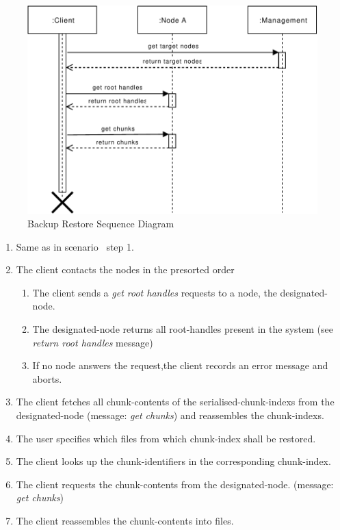\begin{figure}[h]
    \centering
    \includegraphics[width=\linewidth]{resources/backup_restore.pdf}
    \caption{Backup Restore Sequence Diagram}
    \label{fig:backup-restore}
\end{figure}

\begin{enumerate}
    \item Same as in scenario~ step 1.
    \item The \gls{client} contacts the \glspl{node} in the presorted order
        \begin{enumerate}
            \item The \gls{client} sends a \emph{get root handles} requests to a \gls{node}, the \gls{designated-node}.
            \item The \gls{designated-node} returns all \glspl{root-handle} present in the \gls{system} (see \emph{return root handles} message)
            \item If no \gls{node} answers the request,the \gls{client} records an error message and aborts.
        \end{enumerate}
    \item The \gls{client} fetches all \glspl{chunk-content} of the \glspl{serialised-chunk-index} from the \gls{designated-node} (message: \emph{get chunks}) and reassembles the \glspl{chunk-index}.
    \item The \gls{user} specifies which \glspl{file} from which \gls{chunk-index} shall be restored.
    \item The \gls{client} looks up the \glspl{chunk-identifier} in the corresponding \gls{chunk-index}.
    \item The \gls{client} requests the \glspl{chunk-content} from the \gls{designated-node}. (message: \emph{get chunks})
    \item The \gls{client} reassembles the \glspl{chunk-content} into \glspl{file}.
\end{enumerate}

